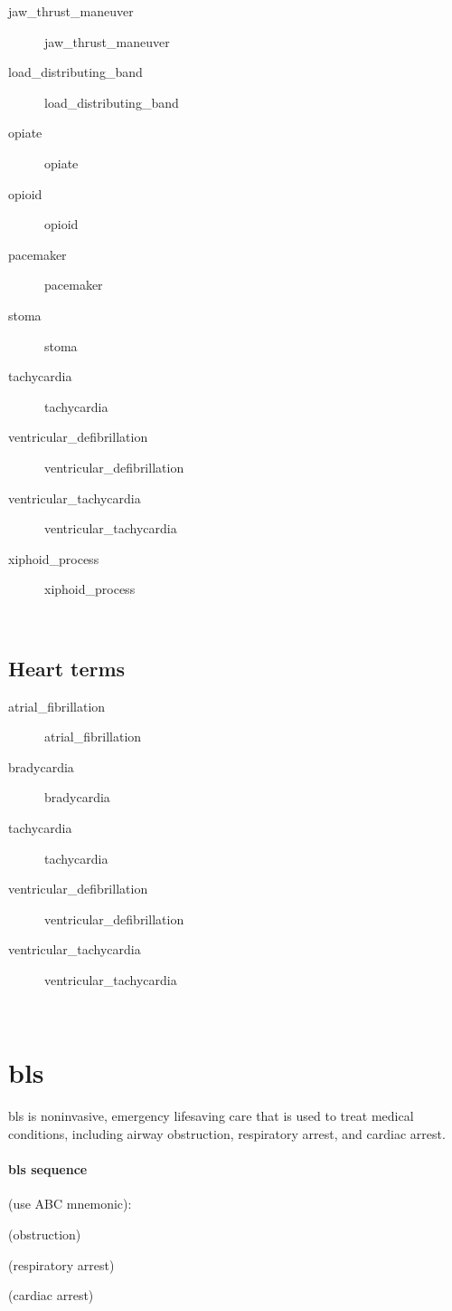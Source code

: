 \documentclass[../../EMT-169.tex]{subfiles}
\begin{document}
\begin{description}
	\item [\gls{jaw_thrust_maneuver}] 					\glsdesc{jaw_thrust_maneuver}
	\item [\gls{load_distributing_band}] 				\glsdesc{load_distributing_band}
	\item [\gls{opiate}] 								\glsdesc{opiate}
	\item [\gls{opioid}] 								\glsdesc{opioid}
	\item [\gls{pacemaker}] 							\glsdesc{pacemaker}
	\item [\gls{stoma}] 								\glsdesc{stoma}
	\item [\gls{tachycardia}] 							\glsdesc{tachycardia}
	\item [\gls{ventricular_defibrillation}] 			\glsdesc{ventricular_defibrillation}
	\item [\gls{ventricular_tachycardia}] 				\glsdesc{ventricular_tachycardia}
	\item [\gls{xiphoid_process}] 						\glsdesc{xiphoid_process}
\end{description}\hfill \\
\clearpage

\subsection*{Heart terms}
\begin{description}
	\item [\gls{atrial_fibrillation}] \glsdesc{atrial_fibrillation}
	\item [\gls{bradycardia}] \glsdesc{bradycardia}
	\item [\gls{tachycardia}] \glsdesc{tachycardia}
	\item [\gls{ventricular_defibrillation}] \glsdesc{ventricular_defibrillation}
	\item [\gls{ventricular_tachycardia}] \glsdesc{ventricular_tachycardia}
\end{description}\hfill \\

\section{\acrfull{bls}}
\acrshort{bls}  is noninvasive, emergency lifesaving care that is used to treat medical conditions, including airway obstruction, respiratory arrest, and cardiac arrest.

\paragraph{\acrshort{bls} sequence} (use ABC mnemonic):
\begin{description}[leftmargin=!,labelwidth=\widthof{\bfseries respiratory}]
	\item [airway] (obstruction)
	\item [breathing] (respiratory arrest)
	\item [circulation] (cardiac arrest)
\end{description}
\end{document}
